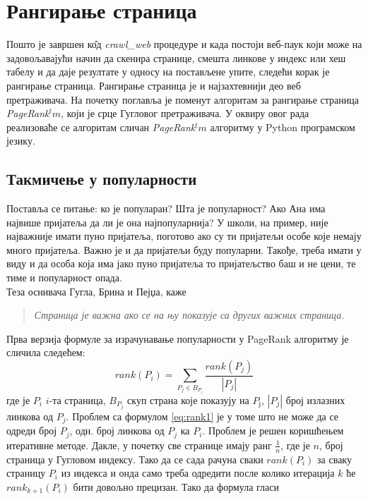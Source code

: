\documentclass[11pt, serbianc, english, titlepage]{article}
\begin{document}
	\section{Рангирање страница}
	Пошто је завршен к\^{о}д \emph{crawl\_web} процедуре и када постоји веб-паук који може на задовољавајући начин да скенира странице, смешта линкове у индекс или хеш табелу и да даје резултате у односу на постављене упите, следећи корак је рангирање страница. Рангирање страница је и најзахтевнији део веб претраживача. На почетку поглавља је поменут алгоритам за рангирање страница \emph{PageRank}$^tm$, који је срце Гугловог претраживача. У оквиру овог рада реализоваће се алгоритам сличан \emph{PageRank}$^tm$ алгоритму у Python програмском језику. 
		\subsection{Такмичење у популарности}
		Поставља се питање: ко је популаран? Шта је популарност? Ако Ана има највише пријатеља да ли је она најпопуларнија? У школи, на пример, није најважније имати пуно пријатеља, поготово ако су ти пријатељи особе које немају много пријатеља. Важно је и да пријатељи буду популарни. Такође, треба имати у виду и да особа која има јако пуно пријатеља то пријатељство баш и не цени, те тиме и популарност опада.\\
		Теза оснивача Гугла, Брина и Пејџа, каже\cite[Ch 4]{langville2011google} \begin{quote}
		\textit{Страница је важна ако се на њу показује са других важних страница.}
		\end{quote}
		Прва верзија формуле за израчунавање популарности у PageRank алгоритму је сличила следећем:
		\begin{equation}\label{eq:rank1}
		rank(P_{i})=\sum_{P_{j}\in B_{P_{i}}}\frac{rank(P_{j})}{\left |P_{j}  \right |}
		\end{equation}
		где је $P_{i}$ $i$-та страница, $B_{P_{j}}$ скуп страна које показују на $P_{ј}$, $\left |P_{j}  \right |$ број излазних линкова од $P_{j}$. Проблем са формулом \ref{eq:rank1} је у томе што не може да се одреди број $P_{j}$, одн. број линкова од $P_{j}$ ка $P_{i}$. Проблем је решен коришћењем итеративне методе. Дакле, у почетку све странице имају ранг $\frac{1}{n}$, где је $n$, број страница у Гугловом индексу. Тако да се сада рачуна сваки $rank(P_{i})$ за сваку страницу $P_{i}$ из индекса и онда само треба одредити после колико итерација $k$ ће $rank_{k+1}(P_{i})$ бити довољно прецизан. Тако да формула гласи\cite[Ch 4.1]{langville2011google}
\end{document}
